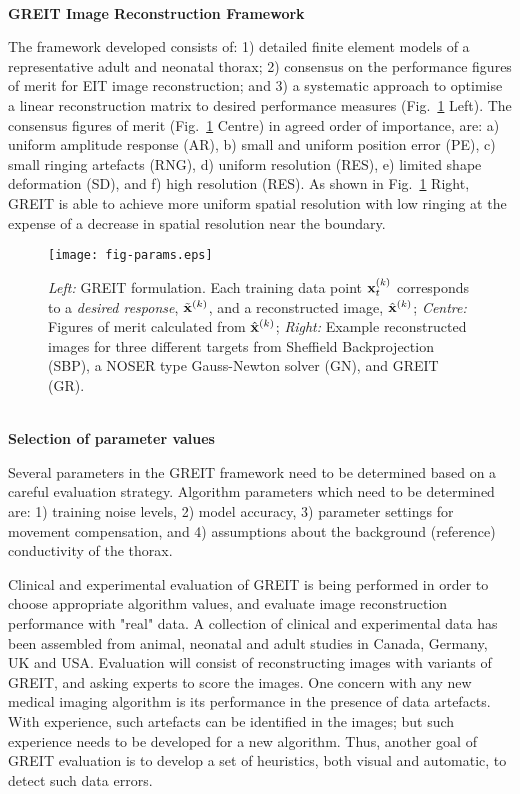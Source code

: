 \documentclass[12pt]{article}
\newcommand{\mysection}[1]{
~\\ \noindent
{\bf \normalsize #1}
\vspace{1mm}
}
\begin{document}
\vspace{-3mm}
\mysection{GREIT Image Reconstruction Framework}

The framework developed\cite{GREIT09} consists of: 1)
detailed finite element models of a representative adult
and neonatal thorax; 2) consensus on the performance
figures of merit for EIT image reconstruction; and 3) a
systematic approach to optimise a linear reconstruction
matrix to desired performance measures (Fig.\ \ref{fig:figparams} Left).
The consensus figures of merit (Fig.\ \ref{fig:figparams} Centre)
 in agreed order of importance,
are: a) uniform amplitude response (AR), b) small and
uniform position error (PE), c) small ringing artefacts (RNG),
d) uniform resolution (RES), e) limited shape deformation (SD),
and f) high resolution (RES). 
As shown in Fig.\ \ref{fig:figparams} Right, GREIT is able to 
achieve more uniform spatial resolution with low ringing at the
expense of a decrease in spatial resolution near the boundary.
\vspace{-4mm}
\begin{figure}[htp]
\centering
\texttt{[image: fig-params.eps]}
\vspace{-6mm}
\caption{%
\small
{\em Left:} GREIT formulation. Each training data point
    ${\bf x}_t^{(k)}$ corresponds to a {\em desired response},
$\tilde{\bf x}^{(k)}$, and a reconstructed image,
  $\hat{\bf x}^{(k)}$;
{\em Centre:} Figures of merit calculated from $\hat{\bf x}^{(k)}$;
{\em Right:} Example reconstructed images for three different
targets from
Sheffield Backprojection (SBP), a NOSER type Gauss-Newton solver (GN),
and GREIT (GR).
}
\label{fig:figparams}
\end{figure}

\vspace{-8mm}
\mysection{Selection of parameter values}

Several parameters in the GREIT framework need to be
determined based on a careful
evaluation strategy. Algorithm parameters which need to
be determined are:
1) training noise levels,
2) model accuracy,
3) parameter settings for movement compensation, and
4) assumptions about the background (reference)
   conductivity of the thorax.

Clinical and experimental evaluation of GREIT is being
performed in order to choose appropriate algorithm values,
and evaluate image reconstruction performance with "real"
data. A collection of clinical and experimental data has
been assembled from animal, neonatal  and adult studies
in Canada, Germany, UK and USA. Evaluation will consist
of reconstructing images with variants of GREIT, and
asking experts to score the images.  One concern with any
new medical imaging algorithm is its performance in the
presence of data artefacts. With experience, such artefacts
can be identified in the images; but such experience needs
to be developed for a new algorithm.  Thus, another goal
of GREIT evaluation is to develop a set of heuristics,
both visual and automatic, to detect such data errors.
\end{document}
